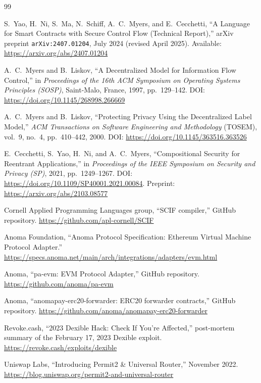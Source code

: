\documentclass[11pt,a4paper]{article}
\begin{document}
\begin{thebibliography}{99}

  S.~Yao, H.~Ni, S.~Ma, N.~Schiff, A.~C.~Myers, and E.~Cecchetti,
  ``A Language for Smart Contracts with Secure Control Flow (Technical
  Report),''
  arXiv preprint \texttt{arXiv:2407.01204}, July 2024 (revised April 2025).
  Available: \url{https://arxiv.org/abs/2407.01204}

  A.~C.~Myers and B.~Liskov,
  ``A Decentralized Model for Information Flow Control,''
  in \emph{Proceedings of the 16th ACM Symposium on Operating Systems
  Principles (SOSP)}, Saint-Malo, France, 1997, pp.~129--142.
  DOI: \url{https://doi.org/10.1145/268998.266669}

  A.~C.~Myers and B.~Liskov,
  ``Protecting Privacy Using the Decentralized Label Model,''
  \emph{ACM Transactions on Software Engineering and Methodology}
  (TOSEM), vol.~9, no.~4, pp.~410--442, 2000.
  DOI: \url{https://doi.org/10.1145/363516.363526}

  E.~Cecchetti, S.~Yao, H.~Ni, and A.~C.~Myers,
  ``Compositional Security for Reentrant Applications,''
  in \emph{Proceedings of the IEEE Symposium on Security and Privacy
  (SP)}, 2021, pp.~1249--1267.
  DOI: \url{https://doi.org/10.1109/SP40001.2021.00084}.
  Preprint: \url{https://arxiv.org/abs/2103.08577}

  Cornell Applied Programming Languages group,
  ``SCIF compiler,'' GitHub repository.
  \url{https://github.com/apl-cornell/SCIF}

  Anoma Foundation, ``Anoma Protocol Specification: Ethereum Virtual Machine
  Protocol Adapter.''
  \url{https://specs.anoma.net/main/arch/integrations/adapters/evm.html}

  Anoma, ``pa-evm: EVM Protocol Adapter,'' GitHub repository.
  \url{https://github.com/anoma/pa-evm}

  Anoma, ``anomapay-erc20-forwarder: ERC20 forwarder contracts,''
  GitHub repository.
  \url{https://github.com/anoma/anomapay-erc20-forwarder}

  Revoke.cash, ``2023 Dexible Hack: Check If You're Affected,''
  post-mortem summary of the February 17, 2023 Dexible exploit.
  \url{https://revoke.cash/exploits/dexible}

  Uniswap Labs, ``Introducing Permit2 \& Universal Router,''
  November 2022.
  \url{https://blog.uniswap.org/permit2-and-universal-router}


\end{thebibliography}
\end{document}

